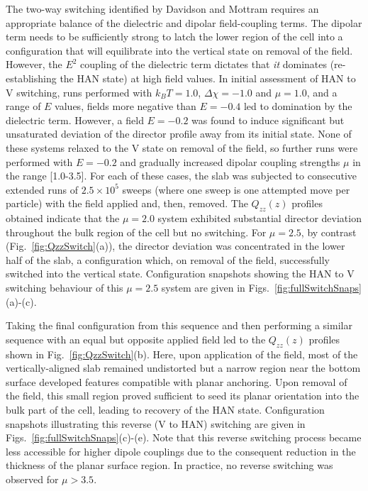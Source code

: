 \documentclass[aps,10pt,twocolumn]{revtex4}
\begin{document}
The two-way switching identified by Davidson and Mottram requires an appropriate balance of the dielectric and
dipolar field-coupling terms. The dipolar term needs to be sufficiently strong to latch the lower region of the
cell into a configuration that will equilibrate into the vertical state on removal of the field. However, the
$E^2$ coupling of the dielectric term dictates that \emph{it} dominates (re-establishing the HAN state) at high
field values. In initial assessment of HAN to V switching, runs performed with $k_BT=1.0$, $\Delta\chi=-1.0$ and
$\mu=1.0$, and a range of $E$ values, fields more negative than $E=-0.4$ led to domination by the dielectric term.
However, a field $E=-0.2$ was found to induce significant but unsaturated deviation of the director profile away
from its initial state. None of these systems relaxed to the V state on removal of the field, so further runs were
performed with $E=-0.2$ and gradually increased dipolar coupling strengths $\mu$ in the range [1.0-3.5]. For each
of these cases, the slab was subjected to consecutive extended runs of $2.5\times 10^5$ sweeps (where one sweep is
one attempted move per particle) with the field applied and, then, removed. The $Q_{zz}(z)$ profiles obtained
indicate that the $\mu=2.0$ system exhibited substantial director deviation throughout the bulk region of the cell
but no switching. For $\mu=2.5$, by contrast (Fig.~\ref{fig:QzzSwitch}(a)), the director deviation was
concentrated in the lower half of the slab, a configuration which, on removal of the field, successfully switched
into the vertical state. Configuration snapshots showing the HAN to V switching behaviour of this $\mu=2.5$ system
are given in Figs.~\ref{fig:fullSwitchSnaps}(a)-(c).

Taking the final configuration from this sequence and then performing a similar sequence with an equal but
opposite applied field led to the $Q_{zz}(z)$ profiles shown in Fig.~\ref{fig:QzzSwitch}(b). Here, upon
application of the field, most of the vertically-aligned slab remained undistorted but a narrow region near the
bottom surface developed features compatible with planar anchoring. Upon removal of the field, this small region
proved sufficient to seed its planar orientation into the bulk part of the cell, leading to recovery of the HAN
state. Configuration snapshots illustrating this reverse (V to HAN) switching are given in
Figs.~\ref{fig:fullSwitchSnaps}(c)-(e). Note that this reverse switching process became less accessible for higher
dipole couplings due to the consequent reduction in the thickness of the planar surface region. In practice, no
reverse switching was observed for $\mu > 3.5$.
\end{document}
